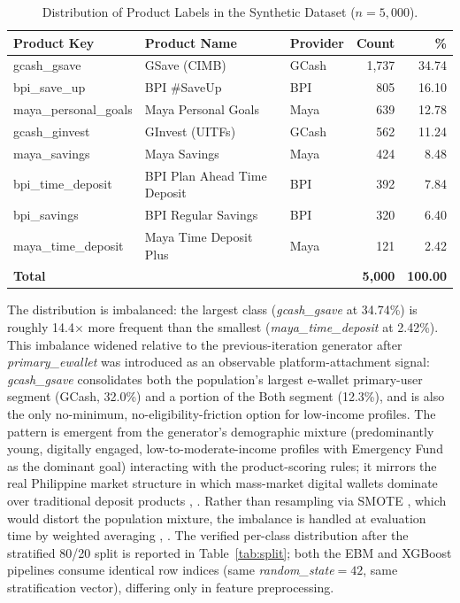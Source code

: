 \documentclass{icsthesis}
\begin{document}
\begin{mainmatter}
					\begin{table}[h]
					\vspace{4ex}
					\centering
					\caption{Distribution of Product Labels in the Synthetic Dataset ($n = 5{,}000$).}
					\label{tab:class-dist}
					\footnotesize
					\begin{tabular}{|l|p{2.5cm}|l|r|r|}
						\hline
						\textbf{Product Key} & \textbf{Product Name} & \textbf{Provider} & \textbf{Count} & \textbf{\%} \\
						\hline
						gcash\_gsave & GSave (CIMB) & GCash & 1{,}737 & 34.74 \\
						bpi\_save\_up & BPI \#SaveUp & BPI & 805 & 16.10 \\
						maya\_personal\_goals & Maya Personal Goals & Maya & 639 & 12.78 \\
						gcash\_ginvest & GInvest (UITFs) & GCash & 562 & 11.24 \\
						maya\_savings & Maya Savings & Maya & 424 & 8.48 \\
						bpi\_time\_deposit & BPI Plan Ahead Time Deposit & BPI & 392 & 7.84 \\
						bpi\_savings & BPI Regular Savings & BPI & 320 & 6.40 \\
						maya\_time\_deposit & Maya Time Deposit Plus & Maya & 121 & 2.42 \\
						\hline
						\textbf{Total} & & & \textbf{5{,}000} & \textbf{100.00} \\
						\hline
					\end{tabular}
					\vspace{4ex}
					\end{table}

					The distribution is imbalanced: the largest class (\emph{gcash\_gsave} at 34.74\%) is roughly 14.4$\times$ more frequent than the smallest (\emph{maya\_time\_deposit} at 2.42\%). This imbalance widened relative to the previous-iteration generator after \emph{primary\_ewallet} was introduced as an observable platform-attachment signal: \emph{gcash\_gsave} consolidates both the population's largest e-wallet primary-user segment (GCash, 32.0\%) and a portion of the Both segment (12.3\%), and is also the only no-minimum, no-eligibility-friction option for low-income profiles. The pattern is emergent from the generator's demographic mixture (predominantly young, digitally engaged, low-to-moderate-income profiles with Emergency Fund as the dominant goal) interacting with the product-scoring rules; it mirrors the real Philippine market structure in which mass-market digital wallets dominate over traditional deposit products \cite{ref35}, \cite{ref42}. Rather than resampling via SMOTE \cite{ref47}, which would distort the population mixture, the imbalance is handled at evaluation time by weighted averaging \cite{ref58}, \cite{ref78}. The verified per-class distribution after the stratified 80/20 split \cite{ref59} is reported in Table~\ref{tab:split}; both the EBM and XGBoost pipelines consume identical row indices (same \emph{random\_state}$=42$, same stratification vector), differing only in feature preprocessing.


\end{mainmatter}
\end{document}
